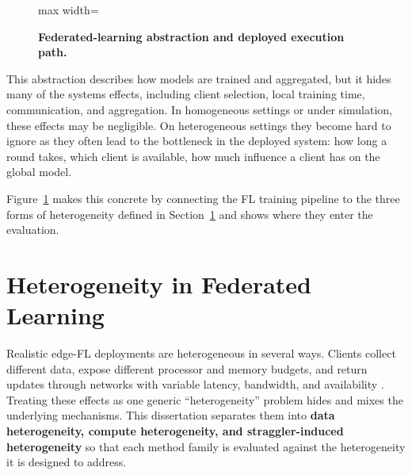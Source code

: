 \begin{figure}[!htbp]
\begin{adjustbox}{max width=\textwidth}
\end{adjustbox}
\caption{\textbf{Federated-learning abstraction and deployed execution path.}}
\label{fig:background_fl_round}
\end{figure}

This abstraction describes how models are trained and aggregated, but it hides many of the systems effects, including client selection, local training time, communication, and aggregation. In homogeneous settings or under simulation, these effects may be negligible. On heterogeneous settings they become hard to ignore as they often lead to the bottleneck in the deployed system: how long a round takes, which client is available, how much influence a client has on the global model.

Figure~\ref{fig:background_fl_round} makes this concrete by connecting the FL training pipeline to the three forms of heterogeneity defined in Section~\ref{sec:heterogeneity_problems} and shows where they enter the evaluation.

\FloatBarrier
\section{Heterogeneity in Federated Learning}
\label{sec:heterogeneity_problems}

Realistic edge-FL deployments are heterogeneous in several ways. Clients collect different data, expose different processor and memory budgets, and return updates through networks with variable latency, bandwidth, and availability \parencite{kairouz2021advances,wang2021field,bonawitz2019towards,lai2022fedscale}. Treating these effects as one generic ``heterogeneity'' problem hides and mixes the underlying mechanisms. This dissertation separates them into \textbf{data heterogeneity, compute heterogeneity, and straggler-induced heterogeneity} so that each method family is evaluated against the heterogeneity it is designed to address.

